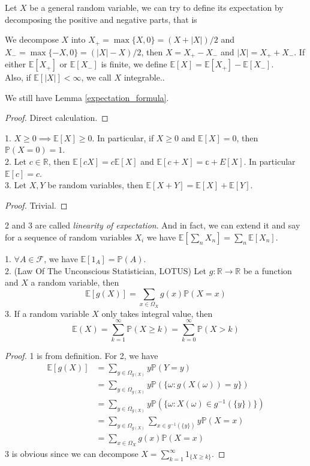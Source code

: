 Let $X$ be a general random variable, we can try to define its expectation by decomposing the positive and negative parts, that is
\begin{definition}
    We decompose $X$ into $X_+=\max\{X,0\}=(X+|X|)/2$ and $X_-=\max\{-X,0\}=(|X|-X)/2$, then $X=X_+-X_-$ and $|X|=X_++X_-$.
    If either $\mathbb E[X_+]$ or $\mathbb E[X_-]$ is finite, we define $\mathbb E[X]=\mathbb E[X_+]-\mathbb E[X_-]$.\\
    Also, if $\mathbb E[|X|]<\infty$, we call $X$ integrable..
\end{definition}
\begin{lemma}
    We still have Lemma \ref{expectation_formula}.
\end{lemma}
\begin{proof}
    Direct calculation.
\end{proof}
\begin{proposition}
    1. $X\ge 0\implies \mathbb E[X]\ge 0$.
    In particular, if $X\ge 0$ and $\mathbb E[X]=0$, then $\mathbb P(X=0)=1$.\\
    2. Let $c\in\mathbb R$, then $\mathbb E[cX]=c\mathbb E[X]$ and $\mathbb E[c+X]=\mathbb c+E[X]$.
    In particular $\mathbb E[c]=c$.\\
    3. Let $X,Y$ be random variables, then $\mathbb E[X+Y]=\mathbb E[X]+\mathbb E[Y]$.
\end{proposition}
\begin{proof}
    Trivial.
\end{proof}
2 and 3 are called \textit{linearity of expectation}.
And in fact, we can extend it and say for a sequence of random variables $X_i$ we have $\mathbb E\left[\sum_nX_n\right]=\sum_n\mathbb E[X_n]$.
\begin{proposition}
    1. $\forall A\in\mathscr F$, we have $\mathbb E[1_A]=\mathbb P(A)$.\\
    2. (Law Of The Unconscious Statistician, LOTUS) Let $g:\mathbb R\to\mathbb R$ be a function and $X$ a random variable, then
    $$\mathbb E[g(X)]=\sum_{x\in\Omega_X}g(x)\mathbb P(X=x)$$
    3. If a random variable $X$ only takes integral value, then
    $$\mathbb E(X)=\sum_{k=1}^\infty\mathbb P(X\ge k)=\sum_{k=0}^\infty\mathbb P(X>k)$$
\end{proposition}
\begin{proof}
    1 is from definition.
    For 2, we have
    \begin{align*}
        \mathbb E[g(X)]&=\sum_{y\in\Omega_{g(X)}}y\mathbb P(Y=y)\\
        &=\sum_{y\in\Omega_{g(X)}}y\mathbb P(\{\omega:g(X(\omega))=y\})\\
        &=\sum_{y\in\Omega_{g(X)}}y\mathbb P(\{\omega:X(\omega)\in g^{-1}(\{y\})\})\\
        &=\sum_{y\in\Omega_{g(X)}}\sum_{x\in g^{-1}(\{y\})}y\mathbb P(X=x)\\
        &=\sum_{x\in\Omega_X}g(x)\mathbb P(X=x)
    \end{align*}
    3 is obvious since we can decompose $X=\sum_{k=1}^\infty 1_{\{X\ge k\}}$.
\end{proof}

